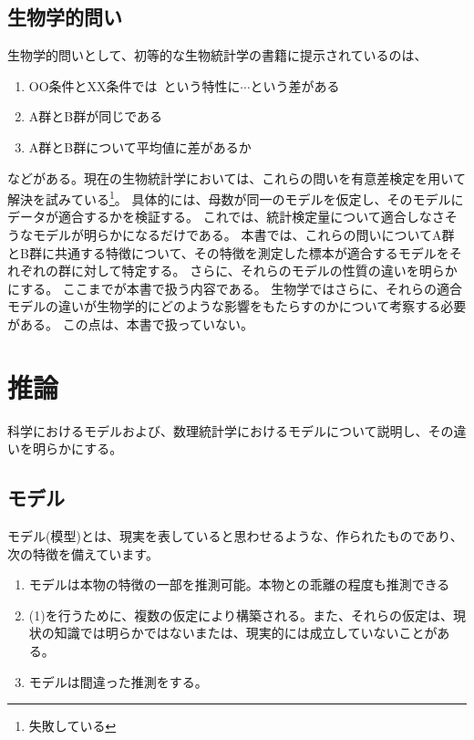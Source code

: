 \section{生物学的問い}
生物学的問いとして、初等的な生物統計学の書籍に提示されているのは、
\begin{enumerate}
    \item OO条件とXX条件では~という特性に$\cdots$という差がある
    \item A群とB群が同じである
    \item A群とB群について平均値に差があるか
\end{enumerate}
などがある。現在の生物統計学においては、これらの問いを有意差検定を用いて解決を試みている\footnote{失敗している}。
具体的には、母数が同一のモデルを仮定し、そのモデルにデータが適合するかを検証する。
これでは、統計検定量について適合しなさそうなモデルが明らかになるだけである。
本書では、これらの問いについてA群とB群に共通する特徴について、その特徴を測定した標本が適合するモデルをそれぞれの群に対して特定する。
さらに、それらのモデルの性質の違いを明らかにする。
ここまでが本書で扱う内容である。
生物学ではさらに、それらの適合モデルの違いが生物学的にどのような影響をもたらすのかについて考察する必要がある。
この点は、本書で扱っていない。






\chapter{推論}
科学におけるモデルおよび、数理統計学におけるモデルについて説明し、その違いを明らかにする。

\section{モデル}
モデル(模型)とは、現実を表していると思わせるような、作られたものであり、次の特徴を備えています。
\begin{enumerate}
    \item モデルは本物の特徴の一部を推測可能。本物との乖離の程度も推測できる
    \item (1)を行うために、複数の仮定により構築される。また、それらの仮定は、現状の知識では明らかではないまたは、現実的には成立していないことがある。
    \item モデルは間違った推測をする。
\end{enumerate}
  

